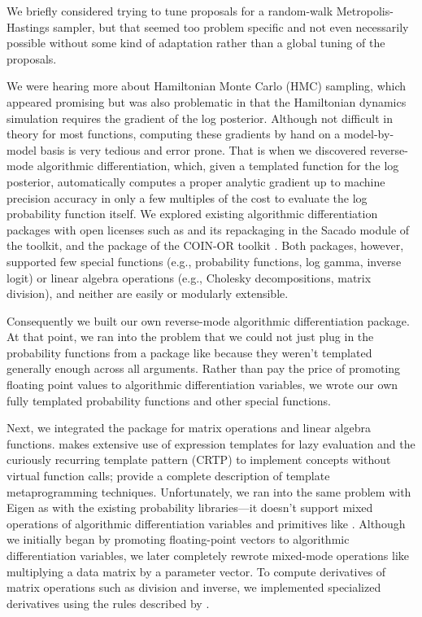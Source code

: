 \documentclass[article]{jss}
\begin{document}
We briefly considered trying to tune proposals for a random-walk
Metropolis-Hastings sampler, but that seemed too problem specific and
not even necessarily possible without some kind of adaptation rather
than a global tuning of the proposals. 

We were hearing more about Hamiltonian Monte Carlo (HMC) sampling,
which appeared promising but was also problematic in that the
Hamiltonian dynamics simulation requires the gradient of the log
posterior.  Although not difficult in theory for most functions,
computing these gradients by hand on a model-by-model basis is very
tedious and error prone.  That is when we discovered reverse-mode
algorithmic differentiation, which, given a templated 
function for the log posterior, automatically computes a proper
analytic gradient up to machine precision accuracy in only a few
multiples of the cost to evaluate the log probability function itself.
We explored existing algorithmic differentiation packages with open
licenses such as  \citep{Gay:2005} and its repackaging in the
Sacado module of the  toolkit, and the 
package of the COIN-OR toolkit \citep{BellBurke:2008}.  Both
packages, however, supported few special functions (e.g., probability
functions, log gamma, inverse logit) or linear algebra operations
(e.g., Cholesky decompositions, matrix division), and neither are
easily or modularly extensible.

Consequently we built our own reverse-mode algorithmic differentiation package.
At that point, we ran into the problem that we could not just plug in
the probability functions from a package like  because they
weren't templated generally enough across all arguments.  Rather
than pay the price of promoting floating point values to algorithmic
differentiation variables, we wrote our own fully templated
probability functions and other special functions.

Next, we integrated the  package  for matrix
operations and linear algebra functions.   makes extensive
use of expression templates for lazy evaluation and the curiously
recurring template pattern (CRTP) to implement concepts without
virtual function calls; \cite{VandevoordeJosuttis:2002} provide a
complete description of template metaprogramming techniques.
Unfortunately, we ran into the same problem with Eigen as with the
existing probability libraries---it doesn't support mixed operations
of algorithmic differentiation variables and primitives like
.  Although we initially began by promoting
floating-point vectors to algorithmic differentiation variables, we
later completely rewrote mixed-mode operations like multiplying a data
matrix by a parameter vector.  To compute derivatives of matrix
operations such as division and inverse, we implemented specialized
derivatives using the rules described by \cite{Giles:2008}.
\end{document}
